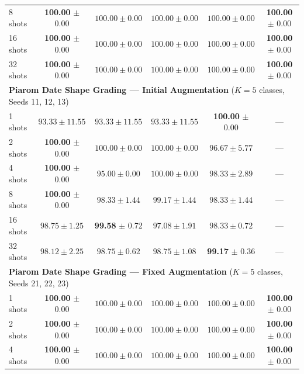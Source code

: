 \documentclass[letterpaper,11pt,leqno]{article}
\begin{document}
\begin{table}[H]
\begin{tabular*}{\textwidth}{@{\extracolsep{\fill}}lccccc}
 8 shots & \cellcolor{bestgreen}\textbf{100.00} $\pm$ 0.00 & $100.00 \pm 0.00$ & $100.00 \pm 0.00$ & $100.00 \pm 0.00$ & \cellcolor{bestgreen}\textbf{100.00} $\pm$ 0.00 \\
 16 shots & \cellcolor{bestgreen}\textbf{100.00} $\pm$ 0.00 & $100.00 \pm 0.00$ & $100.00 \pm 0.00$ & $100.00 \pm 0.00$ & \cellcolor{bestgreen}\textbf{100.00} $\pm$ 0.00 \\
 32 shots & \cellcolor{bestgreen}\textbf{100.00} $\pm$ 0.00 & $100.00 \pm 0.00$ & $100.00 \pm 0.00$ & $100.00 \pm 0.00$ & \cellcolor{bestgreen}\textbf{100.00} $\pm$ 0.00 \\
\midrule
\multicolumn{6}{l}{\textbf{Piarom Date Shape Grading --- Initial Augmentation} ($K=5$ classes, Seeds 11, 12, 13)} \\
\midrule
 1 shots & $93.33 \pm 11.55$ & $93.33 \pm 11.55$ & $93.33 \pm 11.55$ & \cellcolor{bestgreen}\textbf{100.00} $\pm$ 0.00 & --- \\
 2 shots & \cellcolor{bestgreen}\textbf{100.00} $\pm$ 0.00 & $100.00 \pm 0.00$ & $100.00 \pm 0.00$ & $96.67 \pm 5.77$ & --- \\
 4 shots & \cellcolor{bestgreen}\textbf{100.00} $\pm$ 0.00 & $95.00 \pm 0.00$ & $100.00 \pm 0.00$ & $98.33 \pm 2.89$ & --- \\
 8 shots & \cellcolor{bestgreen}\textbf{100.00} $\pm$ 0.00 & $98.33 \pm 1.44$ & $99.17 \pm 1.44$ & $98.33 \pm 1.44$ & --- \\
 16 shots & $98.75 \pm 1.25$ & \cellcolor{bestgreen}\textbf{99.58} $\pm$ 0.72 & $97.08 \pm 1.91$ & $98.33 \pm 0.72$ & --- \\
 32 shots & $98.12 \pm 2.25$ & $98.75 \pm 0.62$ & $98.75 \pm 1.08$ & \cellcolor{bestgreen}\textbf{99.17} $\pm$ 0.36 & --- \\
\midrule
\multicolumn{6}{l}{\textbf{Piarom Date Shape Grading --- Fixed Augmentation} ($K=5$ classes, Seeds 21, 22, 23)} \\
\midrule
 1 shots & \cellcolor{bestgreen}\textbf{100.00} $\pm$ 0.00 & $100.00 \pm 0.00$ & $100.00 \pm 0.00$ & $100.00 \pm 0.00$ & \cellcolor{bestgreen}\textbf{100.00} $\pm$ 0.00 \\
 2 shots & \cellcolor{bestgreen}\textbf{100.00} $\pm$ 0.00 & $100.00 \pm 0.00$ & $100.00 \pm 0.00$ & $100.00 \pm 0.00$ & \cellcolor{bestgreen}\textbf{100.00} $\pm$ 0.00 \\
 4 shots & \cellcolor{bestgreen}\textbf{100.00} $\pm$ 0.00 & $100.00 \pm 0.00$ & $100.00 \pm 0.00$ & $100.00 \pm 0.00$ & \cellcolor{bestgreen}\textbf{100.00} $\pm$ 0.00 \\

\end{tabular*}
\end{table}
\end{document}
